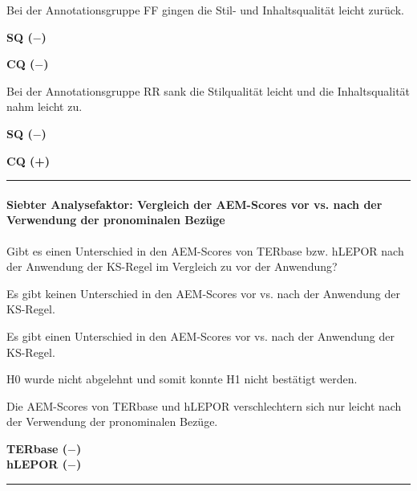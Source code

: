 \medskip
\noindent
\parbox[t]{.8\textwidth}{
Bei der Annotationsgruppe FF gingen die Stil- und Inhaltsqualität leicht zurück.
}
\parbox[t]{.04\textwidth}{}
\parbox[t]{.15\textwidth}{
{ \textbf{SQ ($-$)}}

 \textbf{CQ ($-$)}
}

\medskip
\noindent
\parbox[t]{.8\textwidth}{
Bei der Annotationsgruppe RR sank die Stilqualität leicht und die Inhaltsqualität nahm leicht zu.
}
\parbox[t]{.04\textwidth}{}
\parbox[t]{.15\textwidth}{
{ \textbf{SQ ($-$)}}

 \textbf{CQ (+)}
}

\hrule
\paragraph*{Siebter Analysefaktor: Vergleich der AEM-Scores vor vs. nach der Verwendung der pronominalen Bezüge}
\begin{description}[font=\normalfont\bfseries]
\item [Fragestellung:] Gibt es einen Unterschied in den AEM-Scores von TERbase bzw. hLEPOR nach der Anwendung der KS-Regel im Vergleich zu vor der Anwendung?
\item [H0 --] Es gibt keinen Unterschied in den AEM-Scores vor vs. nach der Anwendung der KS-Regel.
\item [H1 --] Es gibt einen Unterschied in den AEM-Scores vor vs. nach der Anwendung der KS-Regel.
\item [Resultat]
\end{description}
\noindent
\parbox[t]{.75\textwidth}{
H0 wurde nicht abgelehnt und somit konnte H1 nicht bestätigt werden.

Die AEM-Scores von TERbase und hLEPOR verschlechtern sich nur leicht nach der Verwendung der pronominalen Bezüge.
}
\parbox[t]{.04\textwidth}{}
\parbox[t]{.2\textwidth}{
\textbf{TERbase ($-$)\\hLEPOR ($-$)}
}

\hrule
